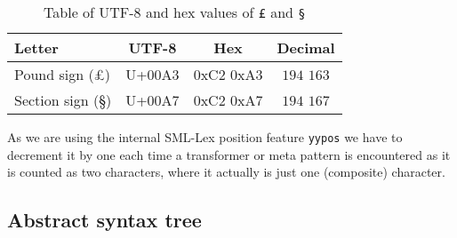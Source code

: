 \begin{table}
  \centering
  \begin{tabular}{|l|c|c|c|}
    \hline
    \textbf{Letter} & \textbf{UTF-8} & \textbf{Hex} & \textbf{Decimal} \\ \hline
    Pound sign (£)   & U+00A3 & 0xC2 0xA3 &  $194$ $163$ \\ \hline
    Section sign (§) & U+00A7 & 0xC2 0xA7 & $194$ $167$ \\ \hline
  \end{tabular}

  \caption{Table of UTF-8 and hex values of \texttt{£} and \texttt{§}}
  \label{tab:utf8-rule-values}
\end{table}

As we are using the internal SML-Lex position feature \texttt{yypos} we have to
decrement it by one each time a transformer or meta pattern is encountered as it
is counted as two characters, where it actually is just one (composite)
character.

\subsection{Abstract syntax tree}


